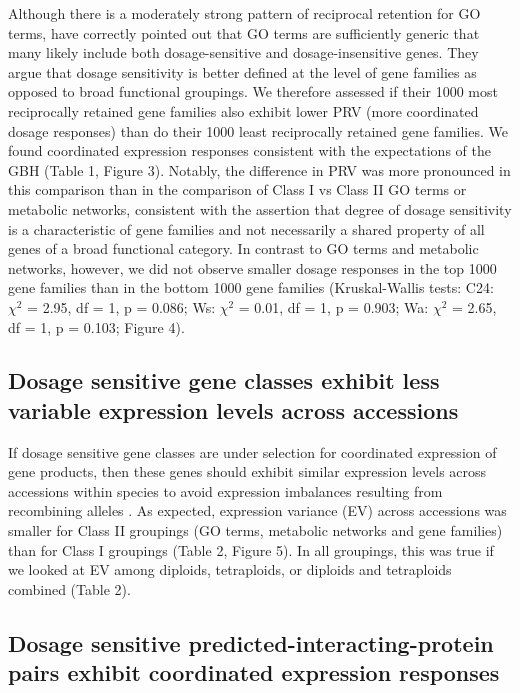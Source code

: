 \documentclass[11pt]{article}
\begin{document}
Although there is a moderately strong pattern of reciprocal retention for GO terms, \cite{tasdighian2017} have correctly pointed out that GO terms are sufficiently generic that many likely include both dosage-sensitive and dosage-insensitive genes. They argue that dosage sensitivity is better defined at the level of gene families as opposed to broad functional groupings. We therefore assessed if their 1000 most reciprocally retained gene families also exhibit lower PRV (more coordinated dosage responses) than do their 1000 least reciprocally retained gene families. We found coordinated expression responses consistent with the expectations of the GBH (Table 1, Figure 3). Notably, the difference in PRV was more pronounced in this comparison than in the comparison of Class I vs Class II GO terms or metabolic networks, consistent with the \cite{tasdighian2017} assertion that degree of dosage sensitivity is a characteristic of gene families and not necessarily a shared property of all genes of a broad functional category. 
	In contrast to GO terms and metabolic networks, however, we did not observe smaller dosage responses in the top 1000 gene families than in the bottom 1000 gene families (Kruskal-Wallis tests: C24: $\chi^2$ = 2.95,  df = 1, p = 0.086; Ws: $\chi^2$ = 0.01,  df = 1, p = 0.903; Wa: $\chi^2$ = 2.65,  df = 1, p = 0.103; Figure 4). 

\subsection*{Dosage sensitive gene classes exhibit less variable expression levels across accessions}

If dosage sensitive gene classes are under selection for coordinated expression of gene products, then these genes should exhibit similar expression levels across accessions within species to avoid expression imbalances resulting from recombining alleles \citep{coate2016}. As expected, expression variance (EV) across accessions was smaller for Class II groupings (GO terms, metabolic networks and gene families) than for Class I groupings (Table 2, Figure 5). In all groupings, this was true if we looked at EV among diploids, tetraploids, or diploids and tetraploids combined (Table 2).

\subsection*{Dosage sensitive predicted-interacting-protein pairs exhibit coordinated expression responses}
\end{document}
